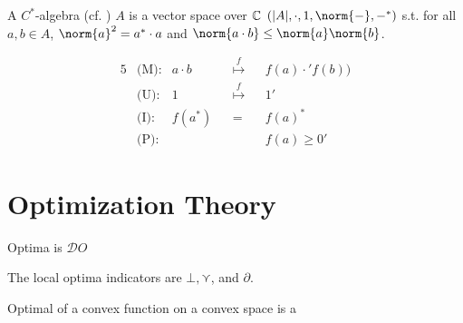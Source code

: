 \begin{Def}A $C^*$-algebra (cf. \parencite[Sec.\todoFill{}]{Jac15}) $A$ is a vector space over $\Bbb{C} $ $(|A|, \cdot, 1, \norm{-}, -^*)$ s.t. for all $a,b \in A$, $\norm{a}^2 = a^* \cdot a$ and $\norm{a \cdot b} \leq \norm{a}\norm{b}$.
\end{Def}

\begin{alignat}{5}
&\text{(M)}\colon& a\cdot b  && \stackrel{f}{\longmapsto}    && f(a) \cdot' f(b)) \label{eq:starM}\\
&\text{(U)}\colon& 1         && \stackrel{f}{\longmapsto}    && 1' \label{eq:starU}\\
&\text{(I)}\colon& f(a^*)    && =                            && f(a)^* \label{eq:starI}\\
&\text{(P)}\colon&&&&& f(a) \geq 0' \label{starP}
\end{alignat}

\section{Optimization Theory}
\begin{Def}
Optima is $\mathcal{D}O$
\end{Def}
\begin{Def}
The local optima indicators are $\bot, \curlyvee$, and $\partial$.
\end{Def}

\begin{Lem}
Optimal of a convex function on a convex space is a \curlyvee 
\end{Lem}
